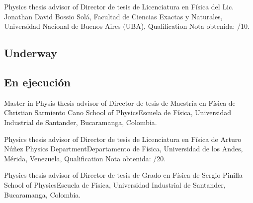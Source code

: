 \ifeng
Physics thesis advisor of
\else
Director de tesis de Licenciatura en Física del
\fi
Lic. Jonathan David Bossio Solá, \at Facultad de Ciencias Exactas y Naturales, Universidad Nacional de Buenos Aires (UBA), \ifeng Qualification \else Nota obtenida: /10.

\ifeng
\subsection*{Underway}
\else
\subsection*{En ejecución}
\fi

\ifeng
Master in Physis thesis advisor of
\else
Director de tesis de Maestría en Física de
\fi
Christian Sarmiento Cano \at \ifeng School of Physics\else Escuela de Física\fi, Universidad Industrial de Santander, Bucaramanga, Colombia.

\ifeng
Physics thesis advisor of
\else
Director de tesis de Licenciatura en Física de
\fi
Arturo Núñez \at \ifeng Physics Department\else Departamento de Física\fi, Universidad de los Andes, Mérida, Venezuela, \ifeng Qualification \else Nota obtenida: /20.

\ifeng
Physics thesis advisor of
\else
Director de tesis de Grado en Física de
\fi
Sergio Pinilla \at \ifeng School of Physics\else Escuela de Física\fi, Universidad Industrial de Santander, Bucaramanga, Colombia.
